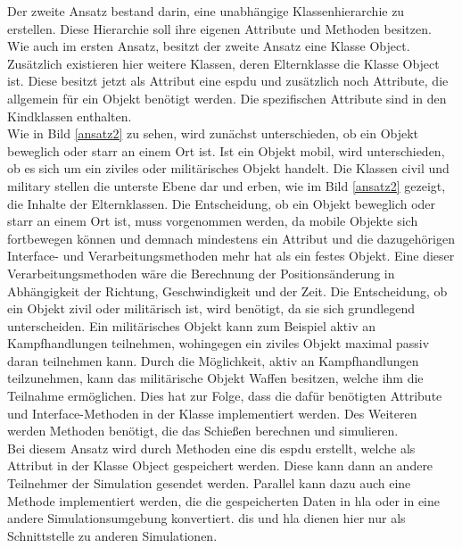Der zweite Ansatz bestand darin, eine unabhängige Klassenhierarchie zu erstellen. Diese Hierarchie soll ihre eigenen Attribute und Methoden besitzen. Wie auch im ersten Ansatz, besitzt der zweite Ansatz eine Klasse \glqq Object\grqq{}. Zusätzlich existieren hier weitere Klassen, deren Elternklasse die Klasse \glqq Object\grqq{} ist. Diese besitzt jetzt als Attribut eine \ac{espdu} und zusätzlich noch Attribute, die allgemein für ein Objekt benötigt werden. Die spezifischen Attribute sind  in den  Kindklassen enthalten. \\  Wie in Bild \ref{ansatz2} zu sehen, wird zunächst unterschieden, ob ein Objekt beweglich oder starr an einem Ort ist. Ist ein Objekt mobil, wird unterschieden, ob es sich um ein ziviles oder militärisches Objekt handelt. Die Klassen \glqq civil\grqq{} und \glqq military\grqq{} stellen die unterste Ebene dar und erben, wie im Bild \ref{ansatz2} gezeigt, die Inhalte der Elternklassen. Die Entscheidung, ob ein Objekt beweglich oder starr an einem Ort ist, muss vorgenommen werden, da mobile Objekte sich fortbewegen können und demnach mindestens ein Attribut und die dazugehörigen Interface- und Verarbeitungsmethoden mehr hat als ein festes Objekt. Eine dieser  Verarbeitungsmethoden wäre die Berechnung der Positionsänderung in Abhängigkeit der Richtung, Geschwindigkeit und der Zeit. Die Entscheidung, ob ein Objekt zivil oder militärisch ist, wird benötigt, da sie sich grundlegend unterscheiden. Ein militärisches Objekt kann zum Beispiel aktiv an Kampfhandlungen teilnehmen, wohingegen ein ziviles Objekt maximal passiv daran teilnehmen kann. Durch die  Möglichkeit, aktiv an Kampfhandlungen teilzunehmen, kann das militärische Objekt Waffen besitzen, welche ihm die Teilnahme ermöglichen. Dies hat zur Folge, dass die dafür benötigten Attribute und Interface-Methoden in der Klasse implementiert werden. Des Weiteren werden Methoden benötigt, die das Schießen berechnen und simulieren. \\
Bei diesem Ansatz wird durch Methoden eine \ac{dis} \acl{espdu} erstellt, welche als Attribut in der Klasse \glqq Object\grqq{} gespeichert werden. Diese kann dann an andere Teilnehmer der Simulation gesendet werden. Parallel kann dazu auch eine Methode implementiert werden, die die gespeicherten Daten in \ac{hla} oder in eine andere Simulationsumgebung  konvertiert. \ac{dis} und \ac{hla} dienen hier nur als Schnittstelle zu anderen Simulationen. 
